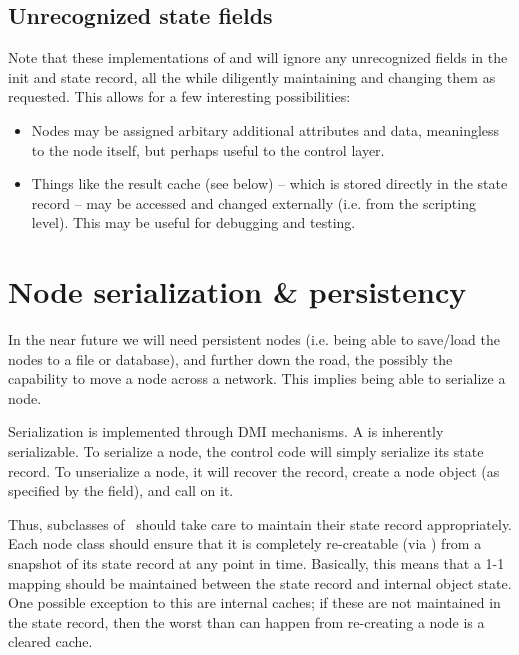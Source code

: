 \documentclass[10pt,twoside]{book}
\begin{document}
\subsection{Unrecognized state fields}

  Note that these implementations of  and  will
  ignore any unrecognized fields in the init and state record, all the while 
  diligently maintaining and changing them as requested. This allows for a few
  interesting possibilities:

  \begin{itemize}
  
  \item Nodes may be assigned arbitary additional attributes and data,
    meaningless to the node itself, but perhaps useful to the control layer.

  \item Things like the result cache (see below) -- which is stored directly in
    the state record -- may be accessed and changed externally (i.e. from the
    scripting level). This may be useful for debugging and testing.

  \end{itemize}

\section{Node serialization \& persistency}

  In the near future we will need persistent nodes (i.e. being able to
  save/load the nodes to a file or database), and further down the road, the
  possibly the capability to move a node across a network. This implies being
  able to serialize a node.
  
  Serialization is implemented through DMI mechanisms. A  is
  inherently serializable. To serialize a node, the control code will simply
  serialize its state record. To unserialize a node, it will recover the
  record, create a node object (as specified by the  field), and call
   on it. 

  Thus, subclasses of \Node\ should take care to maintain their state record
  appropriately. Each node class should ensure that it is completely
  re-creatable (via ) from a snapshot of its state record at any
  point in time. Basically, this means that a 1-1 mapping should be maintained
  between the state record and internal object state. One possible exception to
  this are internal caches; if these are not maintained in the state record,
  then the worst than can happen from re-creating a node is a cleared cache.
  
\end{document}
